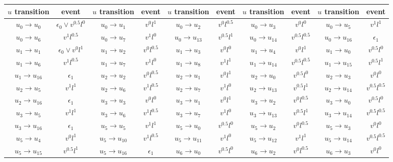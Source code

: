 \documentclass[conf]{new-aiaa}
\begin{document}
\begin{table*}[]
    \centering
    \begin{tabular}{c|c|c|c|c|c|c|c|c|c}
    \hline
         $u$ transition & event &  $u$ transition & event & $u$ transition & event & $u$ transition & event & $u$ transition & event\\
    \hline
         $u_0 \to u_0$  & $\epsilon_0 \lor v^{0.5}l^0$ &  $u_0 \to u_1$ & $v^0l^1$ &  $u_0 \to u_2$ & $ v^0l^{0.5}$ & $u_0 \to u_3$ & $v^0l^0$ & $u_0 \to u_5$ & $ v^1l^1$\\
         $u_0 \to u_6$  & $ v^1l^{0.5}$ &  $u_0 \to u_7$ & $v^1l^0$ &  $u_0 \to u_{13}$ & $ v^{0.5}l^1$ & $u_0 \to u_{14}$ & $ v^{0.5}l^{0.5}$ & $u_0 \to u_{16}$ & $\epsilon_1$        \\
         
         $u_1 \to u_1$  & $\epsilon_0 \lor v^{0}l^1$ &  $u_1 \to u_2$ & $v^0l^{0.5}$ &  $u_1 \to u_3$ & $ v^0l^{0}$ & $u_1 \to u_4$ & $v^0l^1$ & $u_1 \to u_0$ & $ v^{0.5}l^0$\\
         $u_1 \to u_6$  & $ v^1l^{0.5}$ &  $u_1 \to u_7$ & $v^1l^0$ &  $u_1 \to u_8$ & $ v^{1}l^1$ & $u_1 \to u_{14}$ & $ v^{0.5}l^{0.5}$ & $u_1 \to u_{15}$ & $ v^{0.5}l^{1}$        \\
         $u_1 \to u_{16}$ & $\epsilon_1$ &  $u_2 \to u_2$ & $v^0l^{0.5}$ & $u_2 \to u_1$ & $v^{0}l^{1}$ & $u_2 \to u_0$ & $v^{0.5}l^{0}$ & $u_2 \to u_3$ & $ v^0l^{0}$ \\
         $u_2 \to u_5$ & $v^1l^1$ & $u_2 \to u_6$ & $ v^{1}l^{0.5}$ & $u_2 \to u_7$ & $v^1l^0$ & $u_2 \to u_13$ & $v^{0.5}l^1$ & $u_2 \to u_{14}$ & $v^{0.5}l^{0.5}$\\
         $u_2 \to u_{16}$ & $\epsilon_1$ & $u_3 \to u_3$ & $v^0l^{0}$ & $u_3 \to u_1$ & $v^{0}l^{1}$ & $u_3 \to u_2$ & $v^{0}l^{0.5}$ & $u_3 \to u_0$ & $ v^{0.5}l^{0}$\\ 
         $u_3 \to u_5$ & $v^1l^1$ & $u_3 \to u_6$ & $ v^{1}l^{0.5}$ & $u_3 \to u_7$ & $v^1l^0$ & $u_3 \to u_{13}$ & $v^{0.5}l^1$ & $u_3 \to u_{14}$ & $v^{0.5}l^{0.5}$\\
         $u_3 \to u_{16}$ & $\epsilon_1$ & $u_5 \to u_5$ & $v^1l^{1}$ & $u_5 \to u_0$ & $v^{0.5}l^{0}$ & $u_5 \to u_2$ & $v^{0}l^{0.5}$ & $u_5 \to u_3$ & $ v^{0}l^{0}$\\ 
         $u_5 \to u_4$ & $v^0l^1$ & $u_5 \to u_{10}$ & $ v^{1}l^{0.5}$ & $u_5 \to u_{11}$ & $v^1l^0$ & $u_5 \to u_{12}$ & $v^{1}l^1$ & $u_5 \to u_{14}$ & $v^{0.5}l^{0.5}$\\
         $u_5 \to u_{15}$ & $v^{0.5}l^{1}$ & $u_5 \to u_{16}$ & $\epsilon_1$ & $u_6 \to u_0$ & $v^{0.5}l^{0}$ & $u_6 \to u_2$ & $v^{0}l^{0.5}$ & $u_6 \to u_3$ & $ v^{0}l^{0}$ \\

\end{tabular}
\end{table*}
\end{document}
